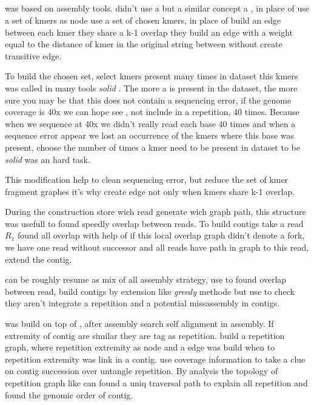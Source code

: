 \documentclass[main]{subfiles}
\begin{document}
\subsection{\flye}

\flye\cite{Flye} was based on \abruijn\cite{abruijn} assembly tools. \abruijn didn't use a \DBG but a similar concept a , in place of use a set of kmers as node  use a set of chosen kmers, in place of build an edge between each kmer they share a k-1 overlap they build an edge with a weight equal to the distance of kmer in the original string between without create transitive edge.

To build the chosen \kmers set, \abruijn select kmers present many times in dataset this kmers was called in many tools \textit{solid} \kmers {} . The more a \kmers is present in the dataset, the more sure you may be that this \kmers does not contain a sequencing error, if the genome coverage is 40x we can hope see \kmer, not include in a repetition, 40 times. Because when we sequence at 40x we didn't really read each base 40 times and when a sequence error appear we lost an occurrence of the kmers where this base was present, choose the number of times a kmer need to be present in dataset to be \textit{solid} was an hard task.

This modification help to clean sequencing error, but reduce the set of kmer fragment \DBG graphes it's why  create edge not only when kmers share k-1 overlap. 

During the  construction \abruijn store wich read generate wich graph path, this structure was usefull to found speedly overlap between reads. To build contigs \abruijn take a read $R_1$ found all overlap with help of  if this local overlap graph didn't denote a fork, we have one read without successor and all reads have path in graph to this read, \abruijn extend the contig.

\abruijn can be roughly resume as mix of all assembly strategy, use \DBG to found overlap between read, build contigs by extension like \textit{greedy} methode but use \OLC to check they aren't integrate a repetition and a potential missassembly in contigs.

\flye was build on top of \abruijn, after \abruijn assembly \flye search self alignment in assembly. If extremity of contig are similar they are tag as repetition. \flye build a repetition graph, where repetition extremity as node and a edge was build when to repetition extremity was link in a contig. \flye use coverage information to take a clue on contig succession over untangle repetition. By analysis the topology of repetition graph \flye like \hinge can found a uniq traversal path to explain all repetition and found the genomic order of contig.
\end{document}

